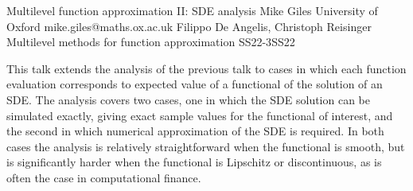 \begin{talk}
  {Multilevel function approximation II: SDE analysis}%
  {Mike Giles}%
  {University of Oxford}%
  {mike.giles@maths.ox.ac.uk}%
  {Filippo De Angelis, Christoph Reisinger}%
{Multilevel methods for function approximation}
{}{SS22-3}{SS22}


  This talk extends the analysis of the previous talk to cases in which each function evaluation corresponds to expected value of a functional of the solution of an SDE.  The analysis covers two cases, one in which the SDE solution can be simulated exactly, giving exact sample values for the functional of interest, and the second in which numerical approximation of the SDE is required.  In both cases the analysis is relatively straightforward when the functional is smooth, but is significantly harder when the functional is Lipschitz or discontinuous, as is often the case in computational finance.

\end{talk}

